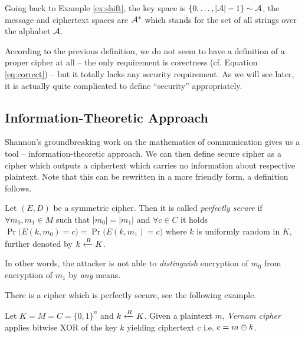 \begin{note}
	Going back to Example \ref{ex:shift}, the key space is $\{0 , \ldots , |{\cal A}|-1\}\sim\cal A$, the message and ciphertext spaces are ${\cal A}^*$ which stands for the set of all strings over the alphabet $\cal A$.
\end{note}

According to the previous definition, we do not seem to have a definition of a proper cipher at all -- the only requirement is corectness (cf. Equation \ref{eq:correct}) -- but it totally lacks any security requirement. As we will see later, it is actually quite complicated to define ``security'' appropriately.


\subsection{Information-Theoretic Approach}

Shannon's groundbreaking work \cite{shannon1949mathematical} on the mathematics of communication gives us a tool -- information-theoretic approach. We can then define secure cipher as a cipher which outputs a ciphertext which carries no information about respective plaintext. Note that this can be rewritten in a more friendly form, a definition follows.

\begin{defn}
\label{def:perfsec}
	Let $(E,D)$ be a symmetric cipher. Then it is called {\em perfectly secure} if $\forall m_0,m_1\in M$ such that $|m_0| = |m_1|$ and $\forall c\in C$ it holds $\Pr\bigl(E(k,m_0)=c\bigr) = \Pr\bigl(E(k,m_1)=c\bigr)$ where $k$ is uniformly random in $K$, further denoted by $k\xleftarrow{R} K$.
\end{defn}

\begin{note}
\label{note:indist}
	In other words, the attacker is not able to {\em distinguish} encryption of $m_0$ from encryption of $m_1$ by {\em any} means.
\end{note}

There is a cipher which is perfectly secure, see the following example.

\begin{example}
	Let $K = M = C = \{0,1\}^n$ and $k\xleftarrow{R} K$. Given a plaintext $m$, {\em Vernam cipher} applies bitwise XOR of the key $k$ yielding ciphertext $c$ i.e. $c = m\oplus k$.
\end{example}

